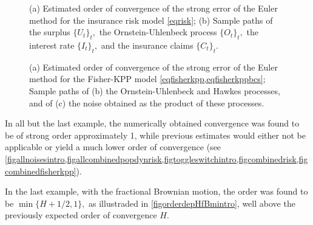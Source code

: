 \documentclass[reqno,12pt]{amsart}
\theoremstyle{plain} %
\theoremstyle{definition} %
\begin{document}
\begin{figure}[htb]
    \caption{(a) Estimated order of convergence of the strong error of the Euler method for the insurance risk model \cref{eqrisk}; (b) Sample paths of the surplus $\{U_t\}_t,$ the Ornstein-Uhlenbeck process $\{O_t\}_t,$ the interest rate $\{I_t\}_t,$ and the insurance claims $\{C_t\}_t.$}
    \label{figcombinedrisk}
\end{figure}

\begin{figure}[htb]
    \caption{(a) Estimated order of convergence of the strong error of the Euler method for the Fisher-KPP model \cref{eqfisherkpp,eqfisherkppbcs}; Sample paths of (b) the Ornstein-Uhlenbeck and Hawkes processes, and of (c) the noise obtained as the product of these processes.}
    \label{figcombinedfisherkpp}
\end{figure}

In all but the last example, the numerically obtained convergence was found to be of strong order approximately 1, while previous estimates would either not be applicable or yield a much lower order of convergence (see \cref{figallnoisesintro,figallcombinedpopdynrisk,figtoggleswitchintro,figcombinedrisk,figcombinedfisherkpp}).

In the last example, with the fractional Brownian motion, the order was found to be $\min\{H+1/2, 1\},$ as illustraded in \cref{figorderdepHfBmintro}, well above the previously expected order of convergence $H.$
\end{document}
